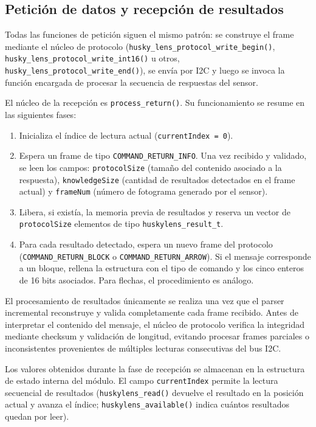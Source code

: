 \documentclass{prgrado}
\begin{document}
\subsection{Petición de datos y recepción de resultados}

Todas las funciones de petición siguen el mismo
patrón: se construye el frame mediante el núcleo de protocolo
(\texttt{husky\_lens\_protocol\_write\_begin()},
\texttt{husky\_lens\_protocol\_write\_int16()} u otros,
\texttt{husky\_lens\_protocol\_write\_end()}), se envía por I2C y luego se
invoca la función encargada de procesar la secuencia de respuestas del sensor.

El núcleo de la recepción es \texttt{process\_return()}. Su funcionamiento se
resume en las siguientes fases:

\begin{enumerate}[noitemsep]
  \item Inicializa el índice de lectura actual
  (\texttt{currentIndex = 0}).

  \item Espera un frame de tipo
  \texttt{COMMAND\_RETURN\_INFO}. Una vez recibido y validado, se leen los
  campos:
  \texttt{protocolSize} (tamaño del contenido asociado a la respuesta),
  \texttt{knowledgeSize} (cantidad de resultados detectados en el frame actual)
  y \texttt{frameNum} (número de fotograma generado por el sensor).

  \item Libera, si existía, la memoria previa de resultados y reserva un vector
  de \texttt{protocolSize} elementos de tipo
  \texttt{huskylens\_result\_t}.

  \item Para cada resultado detectado, espera un nuevo frame del protocolo
  (\texttt{COMMAND\_RETURN\_BLOCK} o
  \texttt{COMMAND\_RETURN\_ARROW}). Si el mensaje corresponde a un bloque,
  rellena la estructura con el tipo de comando y los cinco enteros de 16 bits
  asociados. Para flechas, el procedimiento es análogo.
\end{enumerate}

El procesamiento de resultados únicamente se realiza una vez que el parser
incremental reconstruye y valida completamente cada frame recibido. Antes de
interpretar el contenido del mensaje, el núcleo de protocolo verifica la
integridad mediante checksum y validación de longitud, evitando procesar frames
parciales o inconsistentes provenientes de múltiples lecturas consecutivas del
bus I2C.

Los valores obtenidos durante la fase de recepción se almacenan en la estructura
de estado interna del módulo. El campo \texttt{currentIndex} permite la lectura
secuencial de resultados (\texttt{huskylens\_read()} devuelve el resultado en
la posición actual y avanza el índice; \texttt{huskylens\_available()} indica
cuántos resultados quedan por leer).
\end{document}
